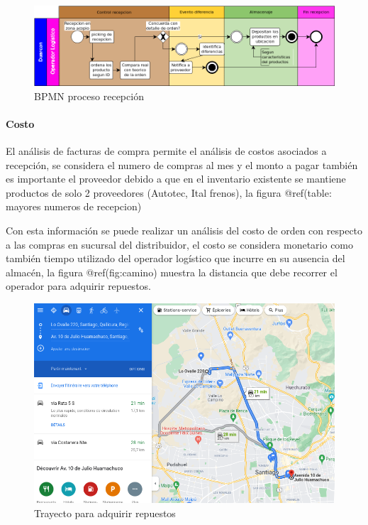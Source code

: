 \documentclass[
]{article}
\begin{document}
\begin{figure}[H]

{\centering \includegraphics[width=0.5\linewidth]{marco teorico/Almacenaje} 

}

\caption{BPMN proceso recepción}\label{fig:unnamed-chunk-9}
\end{figure}

\hypertarget{costo}{%
\paragraph{Costo}\label{costo}}

El análisis de facturas de compra permite el análisis de costos
asociados a recepción, se considera el numero de compras al mes y el
monto a pagar también es importante el proveedor debido a que en el
inventario existente se mantiene productos de solo 2 proveedores
(Autotec, Ital frenos), la figura @ref(table: mayores numeros de
recepcion)

Con esta información se puede realizar un análisis del costo de orden
con respecto a las compras en sucursal del distribuidor, el costo se
considera monetario como también tiempo utilizado del operador logístico
que incurre en su ausencia del almacén, la figura @ref(fig:camino)
muestra la distancia que debe recorrer el operador para adquirir
repuestos.

\begin{figure}[H]

{\centering \includegraphics[width=1\linewidth]{marco teorico/image/caminoabaste} 

}

\caption{Trayecto para adquirir repuestos}\label{fig:unnamed-chunk-11}
\end{figure}
\end{document}
